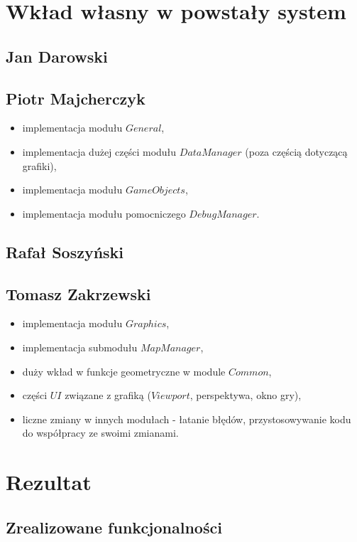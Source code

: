 \documentclass[licencjacka]{pracamgr}
\begin{document}
\chapter{Wkład własny w powstały system}

  \section{Jan Darowski}

  \section{Piotr Majcherczyk}
  \begin{itemize}
   \item implementacja modułu $General$,
   \item implementacja dużej części modułu $DataManager$ (poza częścią dotyczącą grafiki),
   \item implementacja modułu $GameObjects$,
   \item implementacja modułu pomocniczego $DebugManager$.
  \end{itemize}

  \section{Rafał Soszyński}

  \section{Tomasz Zakrzewski}
  \begin{itemize}
   \item implementacja modułu $Graphics$,
   \item implementacja submodułu $MapManager$,
   \item duży wkład w funkcje geometryczne w module $Common$,
   \item części $UI$ związane z grafiką ($Viewport$, perspektywa, okno gry),
   \item liczne zmiany w innych modułach - łatanie błędów, przystosowywanie kodu do współpracy ze swoimi zmianami.
  \end{itemize}

\chapter{Rezultat}

  \section{Zrealizowane funkcjonalności}
\end{document}
